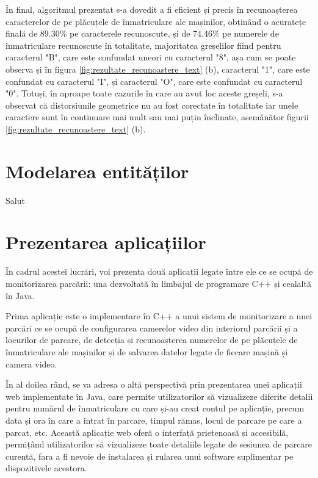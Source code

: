 \documentclass[12pt]{article}
\begin{document}
\^{I}n final, algoritmul prezentat s-a dovedit a fi eficient și precis \^{i}n recunoașterea caracterelor de pe pl\u{a}cuțele de \^{i}nmatriculare ale mașinilor, obțin\^{a}nd o acuratețe final\u{a} de 89.30\% pe caracterele recunoscute, și de 74.46\% pe numerele de \^{i}nmatriculare recunoscute \^{i}n totalitate, majoritatea greșelilor fiind pentru caracterul "B", care este confundat uneori cu caracterul "8", așa cum se poate observa și \^{i}n figura \ref{fig:rezultate_recunoastere_text} (b), caracterul "1", care este confundat cu caracterul "I", și caracterul "O", care este confundat cu caracterul "0". Totuși, \^{i}n aproape toate cazurile \^{i}n care au avut loc aceste greșeli, s-a observat c\u{a} distorsiunile geometrice nu au fost corectate \^{i}n totalitate iar unele caractere sunt \^{i}n continuare mai mult sau mai puțin \^{i}nclinate, asem\u{a}n\u{a}tor figurii \ref{fig:rezultate_recunoastere_text} (b).

\section{Modelarea entităților}

Salut

\newpage

\section{Prezentarea aplicațiilor}

\^{I}n cadrul acestei lucr\u{a}ri, voi prezenta dou\u{a} aplicații legate \^{i}ntre ele ce se ocup\u{a} de monitorizarea parc\u{a}rii: una dezvoltat\u{a} \^{i}n limbajul de programare C++ și cealalt\u{a} \^{i}n Java.

Prima aplicație este o implementare \^{i}n C++ a unui sistem de monitorizare a unei parc\u{a}ri ce se ocup\u{a} de configurarea camerelor video din interiorul parc\u{a}rii și a locurilor de parcare, de detecția și recunoașterea numerelor de pe pl\u{a}cuțele de \^{i}nmatriculare ale mașinilor și de salvarea datelor legate de fiecare mașin\u{a} și camera video. 

\^{I}n al doilea r\^{a}nd, se va adresa o alt\u{a} perspectiv\u{a} prin prezentarea unei aplicații web implementate \^{i}n Java, care permite utilizatorilor s\u{a} vizualizeze diferite detalii pentru num\u{a}rul de \^{i}nmatriculare cu care și-au creat contul pe aplicație, precum data și ora \^{i}n care a intrat \^{i}n parcare, timpul r\u{a}mas, locul de parcare pe care a parcat, etc. Aceast\u{a} aplicație web ofer\u{a} o interfaț\u{a} prietenoas\u{a} și accesibil\u{a}, permiț\^{a}nd utilizatorilor s\u{a} vizualizeze toate detaliile legate de sesiunea de parcare curent\u{a}, fara a fi nevoie de instalarea și rularea unui software suplimentar pe dispozitivele acestora.
\end{document}
